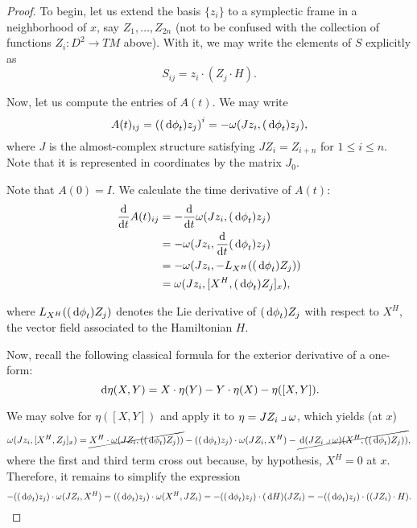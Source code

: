 \begin{proof}
To begin, let us extend the basis $\{z_i\}$ to a symplectic frame in a neighborhood of $x$, say $Z_1, \dots, Z_{2n}$ (not to be confused with the collection of functions $Z_i \colon D^2 \to TM$ above). With it, we may write the elements of $S$ explicitly as
\begin{equation}
S_{ij} = z_i \cdot (Z_j \cdot H).
\end{equation}

Now, let us compute the entries of $A(t)$. We may write
\begin{equation}
A(t)_{ij} = \left((\dl \phi_t) z_j \right)^i = -\omega(J z_i, (\dl \phi_t) z_j),
\end{equation}
where $J$ is the almost-complex structure satisfying $J Z_i = Z_{i+n}$ for $1 \leq i \leq n$. Note that it is represented in coordinates by the matrix $J_0$.

Note that $A(0) = I$. We calculate the time derivative of $A(t)$:
\begin{equation}
\begin{aligned}
\diff*{A(t)_{ij}}t &= - \diff*{\omega(J z_i, (\dl \phi_t) z_j)}t\\
&= - \omega(J z_i, \diff*{(\dl \phi_t) z_j}t)\\
&= - \omega(J z_i, - \Lie_{X^H} ((\dl \phi_t) Z_j))\\
&= \omega(J z_i, [X^H,(\dl \phi_t) Z_j]_x),
\end{aligned}
\end{equation}

where $\Lie_{X^H} ((\dl \phi_t)Z_j)$ denotes the Lie derivative of $(\dl \phi_t)Z_j$ with respect to $X^H$, the vector field associated to the Hamiltonian $H$.

Now, recall the following classical formula for the exterior derivative of a one-form:
\begin{equation}
\dl \eta(X,Y) = X \cdot \eta(Y) - Y \cdot \eta(X) - \eta([X,Y]).
\end{equation}

We may solve for $\eta([X,Y])$ and apply it to $\eta = J Z_i \mathbin{\lrcorner} \omega$, which yields (at $x$)
\begin{equation}
\omega(J z_i, [X^H, Z_j]_x) = \cancel{X^H \cdot \omega(J Z_i, ((\dl \phi_t)Z_j))} - ((\dl \phi_t) z_j) \cdot \omega(J Z_i, X^H) - \cancel{\dl(J Z_i \into \omega)(X^H, ((\dl \phi_t)Z_j))},
\end{equation}
where the first and third term cross out because, by hypothesis, $X^H = 0$ at $x$. Therefore, it remains to simplify the expression
\begin{equation}
- ((\dl \phi_t) z_j) \cdot \omega(J Z_i, X^H) = ((\dl \phi_t) z_j) \cdot \omega(X^H, J Z_i) = - ((\dl \phi_t) z_j) \cdot (\dl H)(J Z_i) = - ((\dl \phi_t) z_j) \cdot ((J Z_i) \cdot H).
\end{equation}


\end{proof}

